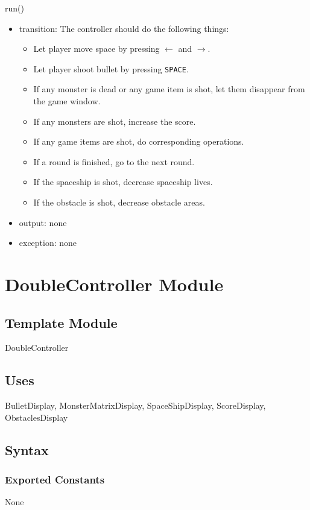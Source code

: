 \documentclass[12pt]{article}
\begin{document}
\noindent run()
\begin{itemize}
\item transition: The controller should do the following things:
\begin{itemize}
\item Let player move space by pressing $\leftarrow$ and $\rightarrow$.
\item Let player shoot bullet by pressing \verb|SPACE|.
\item If any monster is dead or any game item is shot, let them disappear from the game window. 
\item If any monsters are shot, increase the score.
\item If any game items are shot, do corresponding operations. 
\item If a round is finished, go to the next round.
\item If the spaceship is shot, decrease spaceship lives.
\item If the obstacle is shot, decrease obstacle areas.
\end{itemize}
\item output: none
\item exception: none
\end{itemize}
\newpage

\section{DoubleController Module}

\subsection*{Template Module}
DoubleController

\subsection*{Uses}
BulletDisplay, MonsterMatrixDisplay, SpaceShipDisplay, ScoreDisplay,
ObstaclesDisplay

\subsection*{Syntax}
\subsubsection*{Exported Constants}
None
\end{document}
